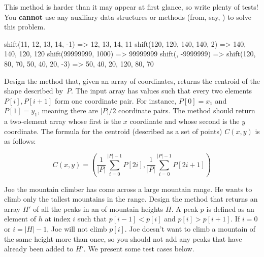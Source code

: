 This method is harder than it may appear at first glance, so write plenty of tests! You \textbf{cannot} use any auxiliary data structures or methods (from, say, ) to solve this problem.

\begin{verbnobox}[\small]
shift({11, 12, 13, 14}, -1)          => {12, 13, 14, 11}
shift({120, 120, 140, 140}, 2)       => {140, 140, 120, 120}
shift({99999999}, 1000)              => {99999999}
shift({}, -9999999)                  => {}
shift({120, 80, 70, 50, 40, 20}, -3) => {50, 40, 20, 120, 80, 70}
\end{verbnobox}


Design the  method that, given an array of coordinates, returns the centroid of the shape described by~$P$. The input array has values such that every two elements $P[i], P[i+1]$ form one coordinate pair. For instance, $P[0] = x_1$ and $P[1] = y_1$, meaning there are $|P|/2$ coordinate pairs. The  method should return a two-element array whose first is the $x$ coordinate and whose second is the $y$ coordinate. The formula for the centroid (described as a set of points) $C(x, y)$ is as follows:

\[
    C(x, y) = \left(\dfrac{1}{|P|}\sum_{i=0}^{|P|-1}{P[2i]}, \dfrac{1}{|P|}\sum_{i=0}^{|P|-1}{P[2i+1]}\right)
\]


Joe the mountain climber has come across a large mountain range. He wants to climb only the tallest mountains in the range. Design the  method that returns an array $H'$ of all the peaks in an  of mountain heights $H$. A peak $p$ is defined as an element of $h$ at index $i$ such that $p[i - 1] < p[i]$ and $p[i] > p[i + 1]$. If $i = 0$ or $i = |H| - 1$, Joe will not climb $p[i]$. Joe doesn't want to climb a mountain of the same height more than once, so you should not add any peaks that have already been added to $H'$. We present some test cases below.

